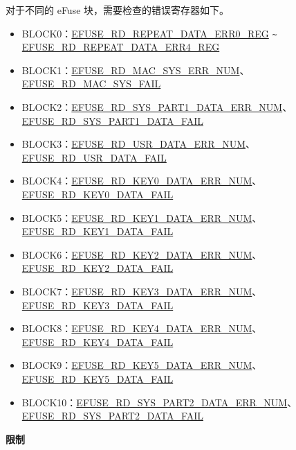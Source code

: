 \documentclass[main\_\_CN.tex]{subfiles}
\begin{document}
\begin{enumerate}
对于不同的 eFuse 块，需要检查的错误寄存器如下。
\begin{itemize}
    \item BLOCK0：\hyperref[regdesc:EFUSERDREPEATDATAERR0REG]{EFUSE\_RD\_REPEAT\_DATA\_ERR0\_REG} \verb+~+ \hyperref[regdesc:EFUSERDREPEATDATAERR4REG]{EFUSE\_RD\_REPEAT\_DATA\_ERR4\_REG}
    \item BLOCK1：\hyperref[fielddesc:EFUSERDMACSYSERRNUM] {EFUSE\_RD\_MAC\_SYS\_ERR\_NUM}、\hyperref[fielddesc:EFUSERDMACSYSFAIL] {EFUSE\_RD\_MAC\_SYS\_FAIL}
    \item BLOCK2：\hyperref[fielddesc:EFUSERDSYSPART1DATAERRNUM] {EFUSE\_RD\_SYS\_PART1\_DATA\_ERR\_NUM}、\hyperref[fielddesc:EFUSERDSYSPART1DATAFAIL] {EFUSE\_RD\_SYS\_PART1\_DATA\_FAIL}
    \item BLOCK3：\hyperref[fielddesc:EFUSERDUSRDATAERRNUM] {EFUSE\_RD\_USR\_DATA\_ERR\_NUM}、\hyperref[fielddesc:EFUSERDUSRDATAFAIL] {EFUSE\_RD\_USR\_DATA\_FAIL}
    \item BLOCK4：\hyperref[fielddesc:EFUSERDKEY0DATAERRNUM] {EFUSE\_RD\_KEY0\_DATA\_ERR\_NUM}、\hyperref[fielddesc:EFUSERDKEY0DATAFAIL] {EFUSE\_RD\_KEY0\_DATA\_FAIL}
    \item BLOCK5：\hyperref[fielddesc:EFUSERDKEY1DATAERRNUM] {EFUSE\_RD\_KEY1\_DATA\_ERR\_NUM}、\hyperref[fielddesc:EFUSERDKEY1DATAFAIL] {EFUSE\_RD\_KEY1\_DATA\_FAIL}
    \item BLOCK6：\hyperref[fielddesc:EFUSERDKEY2DATAERRNUM] {EFUSE\_RD\_KEY2\_DATA\_ERR\_NUM}、\hyperref[fielddesc:EFUSERDKEY2DATAFAIL] {EFUSE\_RD\_KEY2\_DATA\_FAIL}
    \item BLOCK7：\hyperref[fielddesc:EFUSERDKEY3DATAERRNUM] {EFUSE\_RD\_KEY3\_DATA\_ERR\_NUM}、\hyperref[fielddesc:EFUSERDKEY3DATAFAIL] {EFUSE\_RD\_KEY3\_DATA\_FAIL}
    \item BLOCK8：\hyperref[fielddesc:EFUSERDKEY4DATAERRNUM] {EFUSE\_RD\_KEY4\_DATA\_ERR\_NUM}、\hyperref[fielddesc:EFUSERDKEY4DATAFAIL] {EFUSE\_RD\_KEY4\_DATA\_FAIL}
    \item BLOCK9：\hyperref[fielddesc:EFUSERDKEY5DATAERRNUM] {EFUSE\_RD\_KEY5\_DATA\_ERR\_NUM}、\hyperref[fielddesc:EFUSERDKEY5DATAFAIL] {EFUSE\_RD\_KEY5\_DATA\_FAIL}
    \item BLOCK10：\hyperref[fielddesc:EFUSERDSYSPART2DATAERRNUM] {EFUSE\_RD\_SYS\_PART2\_DATA\_ERR\_NUM}、\hyperref[fielddesc:EFUSERDSYSPART2DATAFAIL] {EFUSE\_RD\_SYS\_PART2\_DATA\_FAIL}
\end{itemize}
\end{enumerate}


{\bfseries 限制}
\end{document}

